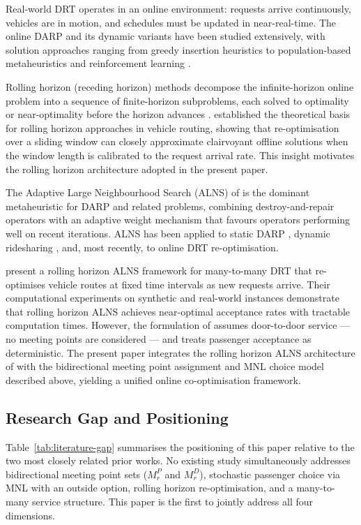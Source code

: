 Real-world DRT operates in an online environment: requests arrive continuously, vehicles are in motion, and schedules must be updated in near-real-time. The online DARP \citep{psaraftis1988} and its dynamic variants have been studied extensively, with solution approaches ranging from greedy insertion heuristics to population-based metaheuristics and reinforcement learning \citep{pillac2013, ho2018}.

Rolling horizon (receding horizon) methods decompose the infinite-horizon online problem into a sequence of finite-horizon subproblems, each solved to optimality or near-optimality before the horizon advances \citep{bent2004}. \citet{bent2004} established the theoretical basis for rolling horizon approaches in vehicle routing, showing that re-optimisation over a sliding window can closely approximate clairvoyant offline solutions when the window length is calibrated to the request arrival rate. This insight motivates the rolling horizon architecture adopted in the present paper.

The Adaptive Large Neighbourhood Search (ALNS) of \citet{ropke2006} is the dominant metaheuristic for DARP and related problems, combining destroy-and-repair operators with an adaptive weight mechanism that favours operators performing well on recent iterations. ALNS has been applied to static DARP \citep{parragh2008a}, dynamic ridesharing \citep{agatz2012}, and, most recently, to online DRT re-optimisation.

\citet{wu2025} present a rolling horizon ALNS framework for many-to-many DRT that re-optimises vehicle routes at fixed time intervals as new requests arrive. Their computational experiments on synthetic and real-world instances demonstrate that rolling horizon ALNS achieves near-optimal acceptance rates with tractable computation times. However, the formulation of \citet{wu2025} assumes door-to-door service — no meeting points are considered — and treats passenger acceptance as deterministic. The present paper integrates the rolling horizon ALNS architecture of \citet{wu2025} with the bidirectional meeting point assignment and MNL choice model described above, yielding a unified online co-optimisation framework.

\subsection{Research Gap and Positioning}

Table~\ref{tab:literature-gap} summarises the positioning of this paper relative to the two most closely related prior works. No existing study simultaneously addresses bidirectional meeting point sets ($M_r^P$ and $M_r^D$), stochastic passenger choice via MNL with an outside option, rolling horizon re-optimisation, and a many-to-many service structure. This paper is the first to jointly address all four dimensions.

